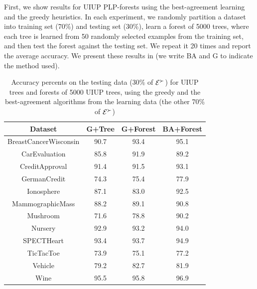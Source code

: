 First, we show results for UIUP PLP-forests using the best-agreement learning
and the greedy heuristics.
In each experiment, we randomly partition a dataset into training
set (70\%) and testing set (30\%), learn a forest of 5000 trees, where
each tree is learned from 50 randomly selected examples from the
training set, and then test the forest against the testing set.
We repeat it 20 times and report the average accuracy.
We present these results in  (we write BA and G to indicate the method used).

\begin{table}
  \centering
  \small
  \caption{Accuracy percents on the testing data (30\% of $\mathcal{E}^\succ$)
					 for UIUP trees and forests of 5000 UIUP trees, 
					 using the greedy and the best-agreement algorithms from the learning 
					 data (the other 70\% of $\mathcal{E}^\succ$)}
  \begin{tabular}{ |c||c|c|c| }
    \hline
    Dataset          & G+Tree & G+Forest & BA+Forest\\
    \hline \hline
    BreastCancerWisconsin              & 90.7   & 93.4     & 95.1 \\ \hline
    CarEvaluation               & 85.8   & 91.9     & 89.2 \\ \hline      
    CreditApproval               & 91.4   & 91.5     & 93.1 \\ \hline       
    GermanCredit               & 74.3   & 75.4     & 77.9 \\ \hline     
    Ionosphere               & 87.1   & 83.0     & 92.5 \\ \hline   
    MammographicMass               & 88.2   & 89.1     & 90.8 \\ \hline         
    Mushroom               & 71.6   & 78.8     & 90.2 \\ \hline 
    Nursery               & 92.9   & 93.2     & 94.0 \\ \hline
    SPECTHeart               & 93.4   & 93.7     & 94.9 \\ \hline   
    TicTacToe              & 73.9   & 75.1     & 77.2 \\ \hline 
    Vehicle               & 79.2   & 82.7     & 81.9 \\ \hline
    Wine               & 95.5   & 95.8     & 96.9 \\ \hline
  \end{tabular}
  \label{tbl:forests1}
\end{table}

